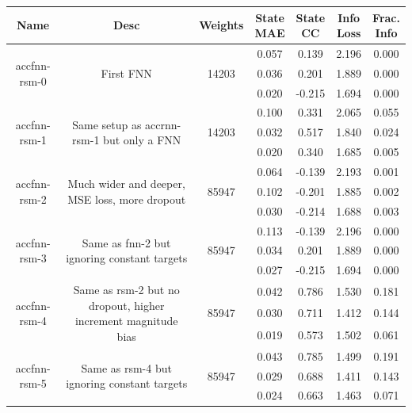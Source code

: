 \begin{table}[h!p]
    \footnotesize
    \centering
\begin{sideways}
    \begin{tabular}{c|c|c|c|c|c|c }
Name & Desc & Weights & \thead{State\\MAE} & \thead{State\\CC} & \thead{Info\\Loss} &\thead{Frac.\\Info}\\
\hline
\multirow{3}{6em}{accfnn-rsm-0} & \multirow{3}{16em}{First FNN} & \multirow{3}{4em}{14203} & 0.057 & 0.139 & 2.196 & 0.000 \\ & & & 0.036 & 0.201 & 1.889 & 0.000 \\ & & & 0.020 & -0.215 & 1.694 & 0.000 \\
\hline
\multirow{3}{6em}{accfnn-rsm-1} & \multirow{3}{16em}{Same setup as accrnn-rsm-1 but only a FNN} & \multirow{3}{4em}{14203} & 0.100 & 0.331 & 2.065 & 0.055 \\ & & & 0.032 & 0.517 & 1.840 & 0.024 \\ & & & 0.020 & 0.340 & 1.685 & 0.005 \\
\hline
\multirow{3}{6em}{accfnn-rsm-2} & \multirow{3}{16em}{Much wider and deeper, MSE loss, more dropout} & \multirow{3}{4em}{85947} & 0.064 & -0.139 & 2.193 & 0.001 \\ & & & 0.102 & -0.201 & 1.885 & 0.002 \\ & & & 0.030 & -0.214 & 1.688 & 0.003 \\
\hline
\multirow{3}{6em}{accfnn-rsm-3} & \multirow{3}{16em}{Same as fnn-2 but ignoring constant targets} & \multirow{3}{4em}{85947} & 0.113 & -0.139 & 2.196 & 0.000 \\ & & & 0.034 & 0.201 & 1.889 & 0.000 \\ & & & 0.027 & -0.215 & 1.694 & 0.000 \\
\hline
\multirow{3}{6em}{accfnn-rsm-4} & \multirow{3}{16em}{Same as rsm-2 but no dropout, higher increment magnitude bias} & \multirow{3}{4em}{85947} & 0.042 & 0.786 & 1.530 & 0.181 \\ & & & 0.030 & 0.711 & 1.412 & 0.144 \\ & & & 0.019 & 0.573 & 1.502 & 0.061 \\
\hline
\multirow{3}{6em}{accfnn-rsm-5} & \multirow{3}{16em}{Same as rsm-4 but ignoring constant targets} & \multirow{3}{4em}{85947} & 0.043 & 0.785 & 1.499 & 0.191 \\ & & & 0.029 & 0.688 & 1.411 & 0.143 \\ & & & 0.024 & 0.663 & 1.463 & 0.071 \\

\end{tabular}
\end{sideways}
\end{table}

